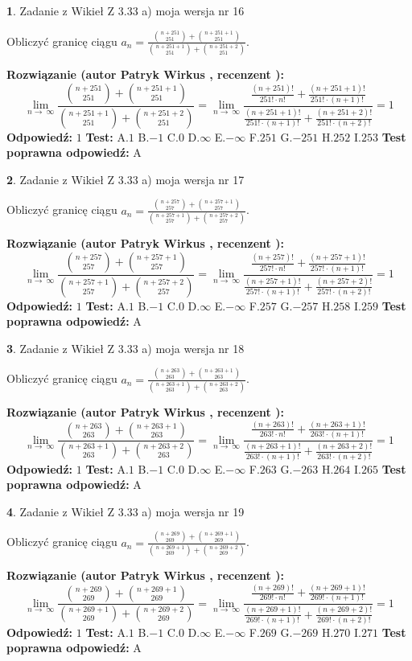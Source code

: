\documentclass[12pt, a4paper]{article}
\theoremstyle{definition} %
\newtheorem{zad}{}
\newcommand{\zadStart}[1]{\begin{zad}#1\newline}
\newcommand{\zadStop}{\end{zad}}
\newcommand{\rozwStart}[2]{\noindent \textbf{Rozwiązanie (autor #1 , recenzent #2): }\newline}
\newcommand{\rozwStop}{\newline}
\newcommand{\odpStart}{\noindent \textbf{Odpowiedź:}\newline}
\newcommand{\odpStop}{\newline}
\newcommand{\testStart}{\noindent \textbf{Test:}\newline}
\newcommand{\testStop}{\newline}
\newcommand{\kluczStart}{\noindent \textbf{Test poprawna odpowiedź:}\newline}
\newcommand{\kluczStop}{\newline}
\begin{document}
\zadStart{Zadanie z Wikieł Z 3.33 a) moja wersja nr 16}

Obliczyć granicę ciągu $a_{n}=\frac{{n+251\choose251}+{n+251+1\choose251}}{{n+251+1\choose251}+{n+251+2\choose251}}$.
\zadStop
\rozwStart{Patryk Wirkus}{}
$$\lim\limits_{n\to\ \infty}\frac{{n+251\choose251}+{n+251+1\choose251}}{{n+251+1\choose251}+{n+251+2\choose251}} = \lim\limits_{n\to\ \infty}\frac{\frac{(n+251)!}{251! \cdot n!}+\frac{(n+251+1)!}{251! \cdot (n+1)!}}{\frac{(n+251+1)!}{251! \cdot (n+1)!}+\frac{(n+251+2)!}{251! \cdot (n+2)!}} = 1$$
\rozwStop
\odpStart
$1$
\odpStop
\testStart
A.$1$ B.$-1$ C.$0$ D.$\infty$ E.$-\infty$
F.$251$ G.$-251$
H.$252$
I.$253$
\testStop
\kluczStart
A
\kluczStop



\zadStart{Zadanie z Wikieł Z 3.33 a) moja wersja nr 17}

Obliczyć granicę ciągu $a_{n}=\frac{{n+257\choose257}+{n+257+1\choose257}}{{n+257+1\choose257}+{n+257+2\choose257}}$.
\zadStop
\rozwStart{Patryk Wirkus}{}
$$\lim\limits_{n\to\ \infty}\frac{{n+257\choose257}+{n+257+1\choose257}}{{n+257+1\choose257}+{n+257+2\choose257}} = \lim\limits_{n\to\ \infty}\frac{\frac{(n+257)!}{257! \cdot n!}+\frac{(n+257+1)!}{257! \cdot (n+1)!}}{\frac{(n+257+1)!}{257! \cdot (n+1)!}+\frac{(n+257+2)!}{257! \cdot (n+2)!}} = 1$$
\rozwStop
\odpStart
$1$
\odpStop
\testStart
A.$1$ B.$-1$ C.$0$ D.$\infty$ E.$-\infty$
F.$257$ G.$-257$
H.$258$
I.$259$
\testStop
\kluczStart
A
\kluczStop



\zadStart{Zadanie z Wikieł Z 3.33 a) moja wersja nr 18}

Obliczyć granicę ciągu $a_{n}=\frac{{n+263\choose263}+{n+263+1\choose263}}{{n+263+1\choose263}+{n+263+2\choose263}}$.
\zadStop
\rozwStart{Patryk Wirkus}{}
$$\lim\limits_{n\to\ \infty}\frac{{n+263\choose263}+{n+263+1\choose263}}{{n+263+1\choose263}+{n+263+2\choose263}} = \lim\limits_{n\to\ \infty}\frac{\frac{(n+263)!}{263! \cdot n!}+\frac{(n+263+1)!}{263! \cdot (n+1)!}}{\frac{(n+263+1)!}{263! \cdot (n+1)!}+\frac{(n+263+2)!}{263! \cdot (n+2)!}} = 1$$
\rozwStop
\odpStart
$1$
\odpStop
\testStart
A.$1$ B.$-1$ C.$0$ D.$\infty$ E.$-\infty$
F.$263$ G.$-263$
H.$264$
I.$265$
\testStop
\kluczStart
A
\kluczStop



\zadStart{Zadanie z Wikieł Z 3.33 a) moja wersja nr 19}

Obliczyć granicę ciągu $a_{n}=\frac{{n+269\choose269}+{n+269+1\choose269}}{{n+269+1\choose269}+{n+269+2\choose269}}$.
\zadStop
\rozwStart{Patryk Wirkus}{}
$$\lim\limits_{n\to\ \infty}\frac{{n+269\choose269}+{n+269+1\choose269}}{{n+269+1\choose269}+{n+269+2\choose269}} = \lim\limits_{n\to\ \infty}\frac{\frac{(n+269)!}{269! \cdot n!}+\frac{(n+269+1)!}{269! \cdot (n+1)!}}{\frac{(n+269+1)!}{269! \cdot (n+1)!}+\frac{(n+269+2)!}{269! \cdot (n+2)!}} = 1$$
\rozwStop
\odpStart
$1$
\odpStop
\testStart
A.$1$ B.$-1$ C.$0$ D.$\infty$ E.$-\infty$
F.$269$ G.$-269$
H.$270$
I.$271$
\testStop
\kluczStart
A
\kluczStop
\end{document}
